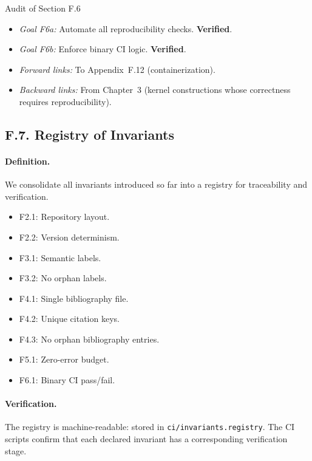 \begin{auditblock}{Audit of Section F.6}
\leavevmode
\begin{itemize}
  \item \emph{Goal F6a:} Automate all reproducibility checks.
        \textbf{Verified}.
  \item \emph{Goal F6b:} Enforce binary CI logic.
        \textbf{Verified}.
  \item \emph{Forward links:} To Appendix~F.12 (containerization).
  \item \emph{Backward links:} From Chapter~3 (kernel constructions
        whose correctness requires reproducibility).
\end{itemize}
\end{auditblock}

\subsection*{F.7. Registry of Invariants}

\paragraph{Definition.}
We consolidate all invariants introduced so far into a registry
for traceability and verification.

\begin{itemize}
  \item F2.1: Repository layout.
  \item F2.2: Version determinism.
  \item F3.1: Semantic labels.
  \item F3.2: No orphan labels.
  \item F4.1: Single bibliography file.
  \item F4.2: Unique citation keys.
  \item F4.3: No orphan bibliography entries.
  \item F5.1: Zero-error budget.
  \item F6.1: Binary CI pass/fail.
\end{itemize}

\paragraph{Verification.}
The registry is machine-readable: stored in
\texttt{ci/invariants.registry}. The CI scripts confirm that each
declared invariant has a corresponding verification stage.

